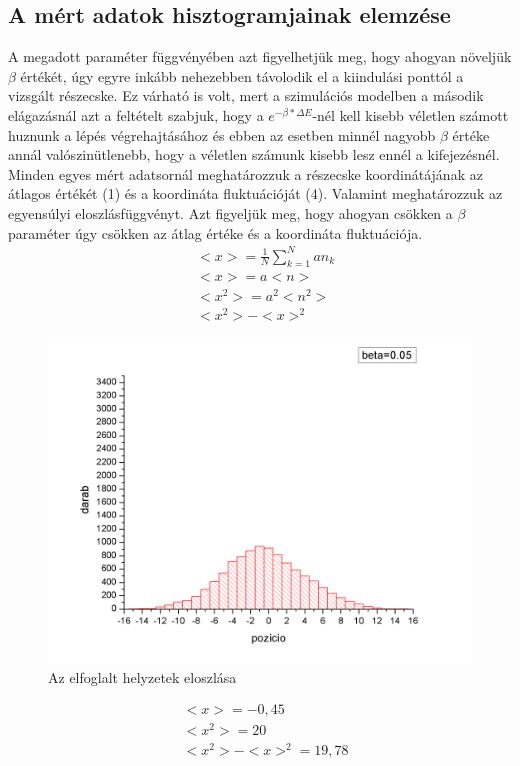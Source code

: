 \documentclass[paper=a4, fontsize=11pt]{article}
\begin{document}
\subsection{A mért adatok hisztogramjainak elemzése}

A megadott paraméter függvényében azt figyelhetjük meg, hogy ahogyan növeljük $\beta$ értékét, úgy egyre inkább nehezebben távolodik el a kiindulási ponttól a vizsgált részecske. Ez várható is volt, mert a szimulációs modelben a második elágazásnál azt a feltételt szabjuk, hogy a $e^{- \beta *\Delta E}$-nél kell kisebb véletlen számott huznunk a lépés végrehajtásához és ebben az esetben minnél nagyobb $\beta$ értéke annál valószinütlenebb, hogy a véletlen számunk kisebb lesz ennél a kifejezésnél.
Minden egyes mért adatsornál meghatározzuk a részecske koordinátájának az átlagos értékét (1) és a koordináta fluktuációját (4). 
Valamint meghatározzuk az egyensúlyi eloszlásfüggvényt. Azt figyeljük meg, hogy ahogyan csökken a $\beta$ paraméter úgy csökken az átlag értéke és a koordináta fluktuációja.
\begin{align}
&<x>= \frac{1}{N} \sum_{k=1}^N an_k\\
&<x>=a<n>\\
&<x^2>=a^2<n^2>\\
&<x^2>-<x>^2
\end{align}

\begin{figure}[H]
\includegraphics[width=\textwidth]{1.png}
\caption{Az elfoglalt helyzetek eloszlása}
\end{figure}

\begin{align}
&<x>= -0,45\\
&<x^2>=20\\
&<x^2>-<x>^2=19,78
\end{align}
\end{document}
